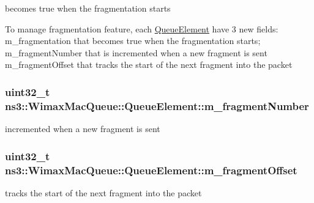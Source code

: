 becomes true when the fragmentation starts 

To manage fragmentation feature, each \hyperlink{structns3_1_1WimaxMacQueue_1_1QueueElement}{Queue\+Element} have 3 new fields\+: m\+\_\+fragmentation that becomes true when the fragmentation starts; m\+\_\+fragment\+Number that is incremented when a new fragment is sent m\+\_\+fragment\+Offset that tracks the start of the next fragment into the packet 
\subsubsection[{\texorpdfstring{m\+\_\+fragment\+Number}{m_fragmentNumber}}]{\setlength{\rightskip}{0pt plus 5cm}uint32\+\_\+t ns3\+::\+Wimax\+Mac\+Queue\+::\+Queue\+Element\+::m\+\_\+fragment\+Number}\hypertarget{structns3_1_1WimaxMacQueue_1_1QueueElement_a20ee38a0ba1c8b312b6c9bb5ae3462d4}{}\label{structns3_1_1WimaxMacQueue_1_1QueueElement_a20ee38a0ba1c8b312b6c9bb5ae3462d4}


incremented when a new fragment is sent 

\subsubsection[{\texorpdfstring{m\+\_\+fragment\+Offset}{m_fragmentOffset}}]{\setlength{\rightskip}{0pt plus 5cm}uint32\+\_\+t ns3\+::\+Wimax\+Mac\+Queue\+::\+Queue\+Element\+::m\+\_\+fragment\+Offset}\hypertarget{structns3_1_1WimaxMacQueue_1_1QueueElement_a6c4535c4f63634ede1e359ea1d3a9ab6}{}\label{structns3_1_1WimaxMacQueue_1_1QueueElement_a6c4535c4f63634ede1e359ea1d3a9ab6}


tracks the start of the next fragment into the packet 

